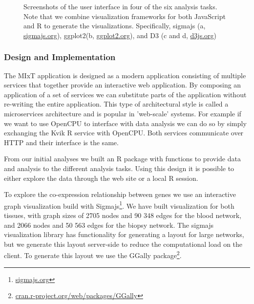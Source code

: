 \begin{figure}[!t]
{\label{fig_first_case}}
\hfil
{}
\caption{Screenshots of the user interface in four of the six analysis tasks.
Note that we combine visualization frameworks for both JavaScript and R to
generate the visualizations. Specifically,
sigmajs (a, \protect\url{sigmajs.org}), ggplot2(b, \protect\url{ggplot2.org}), and 
D3 (c and d, \protect\url{d3js.org})} 
\label{fig_sim}
\end{figure}

\subsubsection*{Design and Implementation}
The MIxT application is designed as a modern application consisting of multiple
services that together provide an interactive web application. By composing an 
application of a set of services we can substitute parts of the application without 
re-writing the entire application. This type of architectural style is called a
microservices architecture and is popular in 'web-scale' systems. For example if
we want to use OpenCPU to interface with data analysis we can do so by simply
exchanging the Kvik R service with OpenCPU. Both services communicate over HTTP
and their interface is the same. 

From our initial analyses we built
an R package with functions to provide data and analysis to the different
analysis tasks. Using this design it is possible to either explore the data
through the web site or a local R session. 

To explore the co-expression relationship between genes we use an interactive
graph visualization build with Sigmajs\footnote{\url{sigmajs.org}}. We have
built visualization for both tissues, with graph sizes of 2705 nodes and 90 348
edges for the blood network, and 2066 nodes and 50 563 edges for the biopsy
network. The sigmajs visualization library has functionality for generating a
layout for large networks, but we generate this layout server-side to reduce the
computational load on the client. To generate this layout we use the GGally
package\footnote{\url{cran.r-project.org/web/packages/GGally}}. 

